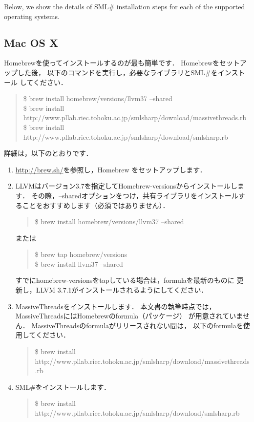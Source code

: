 \documentclass{jbook}
\newcommand{\txt}[2]{#2}
\newcommand{\smlsharp}{SML\#}
\newenvironment{program}{\begin{quote}\begin{tt}}%
                        {\end{tt}\end{quote}}
\begin{document}
	Below, we show the details of \smlsharp{} installation steps for
each of the supported operating systems.
\fi%

\subsection{\txt{Mac OS X}{Mac OS X}}
\ifjp%
	Homebrewを使ってインストールするのが最も簡単です．
	Homebrewをセットアップした後，
以下のコマンドを実行し，必要なライブラリと\smlsharp{}をインストール
してください．
\begin{program}
\$ brew install homebrew/versions/llvm37 --shared\\
\$ brew install http://www.pllab.riec.tohoku.ac.jp/smlsharp/download/massivethreads.rb\\
\$ brew install http://www.pllab.riec.tohoku.ac.jp/smlsharp/download/smlsharp.rb
\end{program}

	詳細は，以下のとおりです．
\begin{enumerate}
\item 
	\url{http://brew.sh/}を参照し，Homebrew をセットアップします．

\item
	LLVMはバージョン3.7を指定してHomebrew-versionsからインストールします．
	その際，--sharedオプションをつけ，共有ライブラリをインストールすることをおすすめします（必須ではありません）．
\begin{program}
\$ brew install homebrew/versions/llvm37 --shared
\end{program}
	または
\begin{program}
\$ brew tap homebrew/versions\\
\$ brew install llvm37 --shared
\end{program}
	すでにhomebrew-versionsをtapしている場合は，formulaを最新のものに
更新し，LLVM 3.7.1がインストールされるようにしてください．

\item
	MassiveThreadsをインストールします．
	本文書の執筆時点では，MassiveThreadsにはHomebrewのformula（パッケージ）
が用意されていません．
	MassiveThreadsのformulaがリリースされない間は，
以下のformulaを使用してください．
\begin{program}
\$ brew install http://www.pllab.riec.tohoku.ac.jp/smlsharp/download/massivethreads.rb
\end{program}

\item
	\smlsharp{}をインストールします．
\begin{program}
\$ brew install http://www.pllab.riec.tohoku.ac.jp/smlsharp/download/smlsharp.rb
\end{program}
\end{enumerate}
\end{document}
